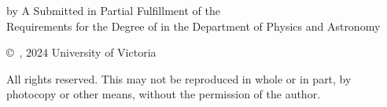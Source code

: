 \pagebreak
{
	\centering
	\thesistitle
	\tpbreak
	by
	\tpbreak
	\nameanddegrees
	\tpbreak
	A \PhDorMas Submitted in Partial Fulfillment of the \\
	Requirements for the Degree of
	\tpbreak
	\PhDorMaster
	\tpbreak
	in the Department of Physics and Astronomy\\
	\vfill
	\begin{center}
		\copyright\ \yourname, 2024 \linebreak
		\phantom{\copyright} University of Victoria
	\end{center}

	All rights reserved. This \PhDorMas may not be reproduced in whole or in part, by \\
	\hfill photocopy or other means, without the permission of the author. 
	\hfill
}
\pagebreak
